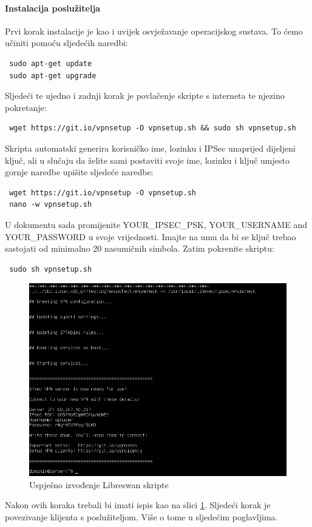 \paragraph*{Instalacija poslužitelja}
\hfill \smallbreak
Prvi korak instalacije je kao i uvijek osvježavanje operacijskog sustava. To ćemo učiniti pomoću sljedećih naredbi:
\begin{lstlisting}
 sudo apt-get update
 sudo apt-get upgrade
\end{lstlisting}
Sljedeći te ujedno i zadnji korak je povlačenje skripte s interneta te njezino pokretanje:
\begin{lstlisting}
 wget https://git.io/vpnsetup -O vpnsetup.sh && sudo sh vpnsetup.sh
\end{lstlisting}
Skripta automatski generira korisničko ime, lozinku i IPSec unaprijed dijeljeni ključ, ali u slučaju da želite sami postaviti svoje ime, lozinku i ključ umjesto gornje naredbe upišite sljedeće naredbe:
\begin{lstlisting}
 wget https://git.io/vpnsetup -O vpnsetup.sh
 nano -w vpnsetup.sh
\end{lstlisting}
U dokumentu sada promijenite YOUR\_IPSEC\_PSK, YOUR\_USERNAME and YOUR\_PASSWORD u svoje vrijednosti. Imajte na umu da bi se ključ trebao sastojati od minimalno 20 nasumičnih simbola. Zatim pokrenite skriptu:
\begin{lstlisting}
 sudo sh vpnsetup.sh
\end{lstlisting}
\begin{figure}[h]
	\centering
	\includegraphics[width=0.7\linewidth]{"slike/Libreswan/VirtualBox_Ubuntu server_11_01_2019_14_38_24"}
	\caption[Uspješno izvođenje Libreswan skripte]{Uspješno izvođenje Libreswan skripte}
	\label{fig:virtualboxubuntu-server11012019143824}
\end{figure}

Nakon ovih koraka trebali bi imati ispis kao na slici \ref{fig:virtualboxubuntu-server11012019143824}. Sljedeći korak je povezivanje klijenta s poslužiteljom. Više o tome u sljedećim poglavljima.
\bigbreak
